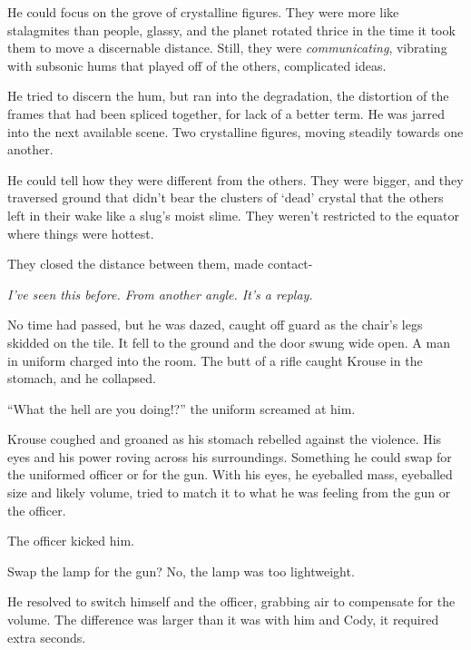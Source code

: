 He could focus on the grove of crystalline figures.  They were more like stalagmites than people, glassy, and the planet rotated thrice in the time it took them to move a discernable distance.  Still, they were \emph{communicating}, vibrating with subsonic hums that played off of the others, complicated ideas.



He tried to discern the hum, but ran into the degradation, the distortion of the frames that had been spliced together, for lack of a better term.  He was jarred into the next available scene.  Two crystalline figures, moving steadily towards one another.



He could tell how they were different from the others.  They were bigger, and they traversed ground that didn't bear the clusters of `dead' crystal that the others left in their wake like a slug's moist slime.  They weren't restricted to the equator where things were hottest.



They closed the distance between them, made contact-



\emph{I've seen this before.  From another angle.  It's a replay.}



No time had passed, but he was dazed, caught off guard as the chair's legs skidded on the tile.  It fell to the ground and the door swung wide open.  A man in uniform charged into the room.  The butt of a rifle caught Krouse in the stomach, and he collapsed.



``What the hell are you doing!?'' the uniform screamed at him.



Krouse coughed and groaned as his stomach rebelled against the violence.  His eyes and his power roving across his surroundings.  Something he could swap for the uniformed officer or for the gun.  With his eyes, he eyeballed mass, eyeballed size and likely volume, tried to match it to what he was feeling from the gun or the officer.



The officer kicked him.



Swap the lamp for the gun?  No, the lamp was too lightweight.



He resolved to switch himself and the officer, grabbing air to compensate for the volume.  The difference was larger than it was with him and Cody, it required extra seconds.



